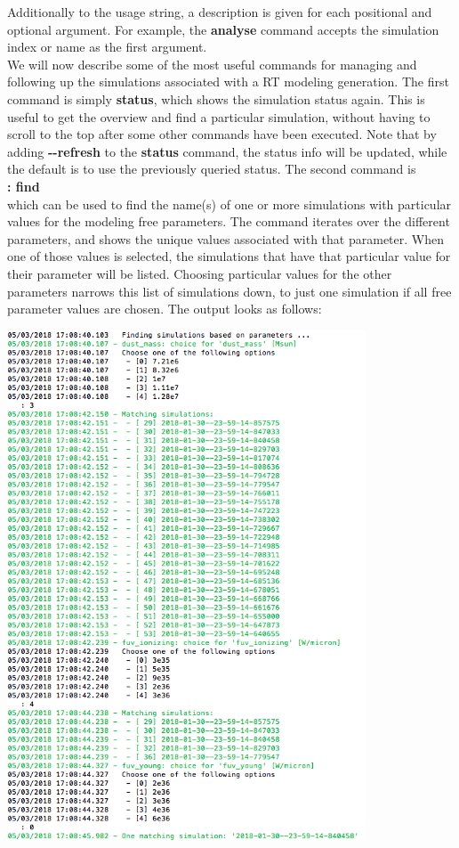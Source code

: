 \documentclass[15pt,a4paper,oneside,openright]{report}
\begin{document}
Additionally to the usage string, a description is given for each positional and optional argument. For example, the \textbf{analyse} command accepts the simulation index or name as the first argument. \\

We will now describe some of the most useful commands for managing and following up the simulations associated with a RT modeling generation. The first command is simply \textbf{status}, which shows the simulation status again. This is useful to get the overview and find a particular simulation, without having to scroll to the top after some other commands have been executed. Note that by adding \textbf{-{}-refresh} to the \textbf{status} command, the status info will be updated, while the default is to use the previously queried status. The second command is\\

\textbf{: find}\\

which can be used to find the name(s) of one or more simulations with particular values for the modeling free parameters. The command iterates over the different parameters, and shows the unique values associated with that parameter. When one of those values is selected, the simulations that have that particular value for their parameter will be listed. Choosing particular values for the other parameters narrows this list of simulations down, to just one simulation if all free parameter values are chosen. The output looks as follows:

\begin{center}
\includegraphics[width=0.8\textwidth]{figures/find_simulation.png}
\end{center}
\end{document}
